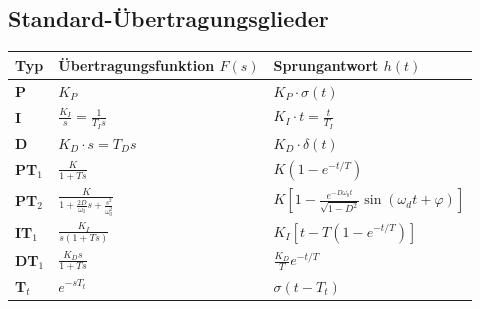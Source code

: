 \subsection{Standard-Übertragungsglieder}
\begin{tcolorbox}
\small
\begin{tabularx}{\columnwidth}{l X X}
\toprule
\textbf{Typ} & \textbf{Übertragungsfunktion $F(s)$} & \textbf{Sprungantwort $h(t)$} \\
\midrule
\textbf{P} & $K_P$ & $K_P \cdot \sigma(t)$ \\[2pt]
\textbf{I} & $\frac{K_I}{s} = \frac{1}{T_I s}$ & $K_I \cdot t = \frac{t}{T_I}$ \\[2pt]
\textbf{D} & $K_D \cdot s = T_D s$ & $K_D \cdot \delta(t)$ \\[2pt]
\textbf{PT}$_1$ & $\frac{K}{1 + T s}$ & $K (1 - e^{-t/T})$ \\[2pt]
\textbf{PT}$_2$ & $\frac{K}{1 + \frac{2D}{\omega_0} s + \frac{s^2}{\omega_0^2}}$ & $K \left[1 - \frac{e^{-D\omega_0 t}}{\sqrt{1-D^2}} \sin(\omega_d t + \varphi)\right]$ \\[2pt]
\textbf{IT}$_1$ & $\frac{K_I}{s (1 + T s)}$ & $K_I [t - T(1 - e^{-t/T})]$ \\[2pt]
\textbf{DT}$_1$ & $\frac{K_D s}{1 + T s}$ & $\frac{K_D}{T} e^{-t/T}$ \\[2pt]
\textbf{T}$_t$ & $e^{-s T_t}$ & $\sigma(t - T_t)$ \\
\bottomrule
\end{tabularx}
\end{tcolorbox}
